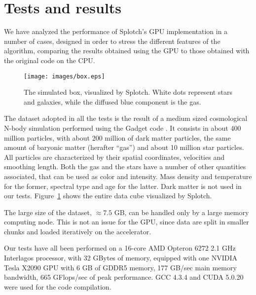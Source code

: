 \documentclass[11pt]{article}
\begin{document}
\section{Tests and results}
\label{sec:results}

We have analyzed the performance of Splotch's GPU implementation in a number of cases, designed in 
order to stress the different features of the algorithm, 
comparing the results 
obtained using the GPU to those obtained with the original code on the CPU. 

\begin{figure}
\centering
\texttt{[image: images/box.eps]}
\caption{The simulated box, visualized by Splotch. White dots represent stars and galaxies, while the 
diffused blue component is the gas.}
\label{fig:box}
\end{figure}

The dataset adopted in all the tests is the result of a medium sized cosmological 
N-body simulation performed using the Gadget code \cite{gadgeturl}. It consists in about 
400 million particles, with about 200 million of dark matter particles, the same amount 
of baryonic matter (herafter ``gas'') and about 10 million star particles. 
All particles are characterized by their spatial coordinates, velocities
and smoothing length. 
Both the gas and the stars have a number of other quantities associated, that can be used 
as color and intensity. Mass density and temperature for the former, spectral type and age
for the latter. Dark matter is not used in our tests. Figure~\ref{fig:box} shows 
the entire data cube visualized by Splotch.

The large size of the dataset, $\approx 7.5$ GB, can be handled only by a large memory computing node. 
This is not an issue for the GPU, since data are split 
in smaller chunks and loaded iteratively on the accelerator. 

Our tests have all been performed on a 16-core AMD Opteron 6272 2.1 GHz Interlagos processor,
with 32 GBytes of memory, equipped with one NVIDIA Tesla X2090 GPU with 6 GB of GDDR5 memory,
177 GB/sec 
main memory bandwidth, 665 GFlops/sec of peak performance. GCC 4.3.4 and CUDA 5.0.20 
were used for the code compilation.
\end{document}
